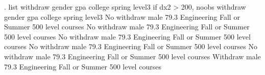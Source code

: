 . list withdraw gender gpa college spring level3 if dx2 > 200, noobs
{\smallskip}
  {\TLC}
  {\VBAR}    withdraw   gender    gpa       college           spring              level3 {\VBAR}
  {\LFTT}
  {\VBAR} No withdraw     male   79.3   Engineering   Fall or Summer   500 level courses {\VBAR}
  {\VBAR} No withdraw     male   79.3   Engineering   Fall or Summer   500 level courses {\VBAR}
  {\VBAR} No withdraw     male   79.3   Engineering   Fall or Summer   500 level courses {\VBAR}
  {\VBAR} No withdraw     male   79.3   Engineering   Fall or Summer   500 level courses {\VBAR}
  {\VBAR} No withdraw     male   79.3   Engineering   Fall or Summer   500 level courses {\VBAR}
  {\LFTT}
  {\VBAR}    Withdraw     male   79.3   Engineering   Fall or Summer   500 level courses {\VBAR}
  {\BLC}
{\smallskip}
